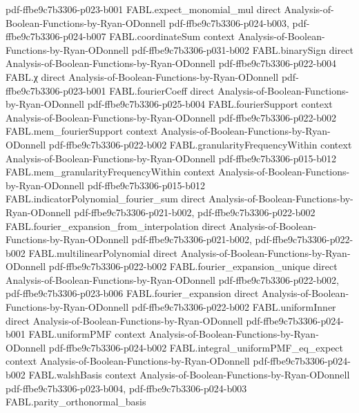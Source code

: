 \begin{theorem}
  {pdf-ffbe9c7b3306-p023-b001}
\proofstep
  {FABL.expect_monomial_mul}
  {direct}
  {Analysis-of-Boolean-Functions-by-Ryan-ODonnell}
  {pdf-ffbe9c7b3306-p024-b003,
    pdf-ffbe9c7b3306-p024-b007}
\proofstep
  {FABL.coordinateSum}
  {context}
  {Analysis-of-Boolean-Functions-by-Ryan-ODonnell}
  {pdf-ffbe9c7b3306-p031-b002}
\proofstep
  {FABL.binarySign}
  {direct}
  {Analysis-of-Boolean-Functions-by-Ryan-ODonnell}
  {pdf-ffbe9c7b3306-p022-b004}
\proofstep
  {FABL.χ}
  {direct}
  {Analysis-of-Boolean-Functions-by-Ryan-ODonnell}
  {pdf-ffbe9c7b3306-p023-b001}
\proofstep
  {FABL.fourierCoeff}
  {direct}
  {Analysis-of-Boolean-Functions-by-Ryan-ODonnell}
  {pdf-ffbe9c7b3306-p025-b004}
\proofstep
  {FABL.fourierSupport}
  {context}
  {Analysis-of-Boolean-Functions-by-Ryan-ODonnell}
  {pdf-ffbe9c7b3306-p022-b002}
\proofstep
  {FABL.mem_fourierSupport}
  {context}
  {Analysis-of-Boolean-Functions-by-Ryan-ODonnell}
  {pdf-ffbe9c7b3306-p022-b002}
\proofstep
  {FABL.granularityFrequencyWithin}
  {context}
  {Analysis-of-Boolean-Functions-by-Ryan-ODonnell}
  {pdf-ffbe9c7b3306-p015-b012}
\proofstep
  {FABL.mem_granularityFrequencyWithin}
  {context}
  {Analysis-of-Boolean-Functions-by-Ryan-ODonnell}
  {pdf-ffbe9c7b3306-p015-b012}
\proofstep
  {FABL.indicatorPolynomial_fourier_sum}
  {direct}
  {Analysis-of-Boolean-Functions-by-Ryan-ODonnell}
  {pdf-ffbe9c7b3306-p021-b002,
    pdf-ffbe9c7b3306-p022-b002}
\proofstep
  {FABL.fourier_expansion_from_interpolation}
  {direct}
  {Analysis-of-Boolean-Functions-by-Ryan-ODonnell}
  {pdf-ffbe9c7b3306-p021-b002,
    pdf-ffbe9c7b3306-p022-b002}
\proofstep
  {FABL.multilinearPolynomial}
  {direct}
  {Analysis-of-Boolean-Functions-by-Ryan-ODonnell}
  {pdf-ffbe9c7b3306-p022-b002}
\proofstep
  {FABL.fourier_expansion_unique}
  {direct}
  {Analysis-of-Boolean-Functions-by-Ryan-ODonnell}
  {pdf-ffbe9c7b3306-p022-b002,
    pdf-ffbe9c7b3306-p023-b006}
\proofstep
  {FABL.fourier_expansion}
  {direct}
  {Analysis-of-Boolean-Functions-by-Ryan-ODonnell}
  {pdf-ffbe9c7b3306-p022-b002}
\proofstep
  {FABL.uniformInner}
  {direct}
  {Analysis-of-Boolean-Functions-by-Ryan-ODonnell}
  {pdf-ffbe9c7b3306-p024-b001}
\proofstep
  {FABL.uniformPMF}
  {context}
  {Analysis-of-Boolean-Functions-by-Ryan-ODonnell}
  {pdf-ffbe9c7b3306-p024-b002}
\proofstep
  {FABL.integral_uniformPMF_eq_expect}
  {context}
  {Analysis-of-Boolean-Functions-by-Ryan-ODonnell}
  {pdf-ffbe9c7b3306-p024-b002}
\proofstep
  {FABL.walshBasis}
  {context}
  {Analysis-of-Boolean-Functions-by-Ryan-ODonnell}
  {pdf-ffbe9c7b3306-p023-b004,
    pdf-ffbe9c7b3306-p024-b003}
\proofstep
  {FABL.parity_orthonormal_basis}

\end{theorem}
